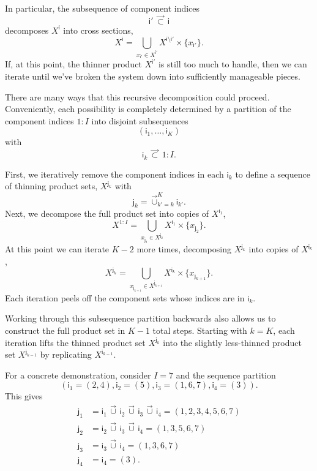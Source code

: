 \documentclass[
  letterpaper,
  DIV=11,
  numbers=noendperiod]{scrartcl}
\begin{document}
In particular, the subsequence of component indices \[
\mathsf{i}' \, \vec{\subset} \, \mathsf{i}
\] decomposes \(X^{ \mathsf{i} }\) into cross sections, \[
X^{ \mathsf{i} }
=
\bigcup_{ x_{ \mathsf{i}' } \in X^{ \mathsf{i}' }  }
X^{ \mathsf{i} \setminus \mathsf{i}' } \times
\{ x_{ \mathsf{i}' } \}.
\] If, at this point, the thinner product \(X^{ \mathsf{i}' }\) is still
too much to handle, then we can iterate until we've broken the system
down into sufficiently manageable pieces.

There are many ways that this recursive decomposition could proceed.
Conveniently, each possibility is completely determined by a partition
of the component indices \(1:I\) into disjoint subsequences \[
( \mathsf{i}_{1}, \ldots, \mathsf{i}_{K} )
\] with \[
\mathsf{i}_{k} \, \vec{\subset} \, 1:I.
\]

First, we iteratively remove the component indices in each
\(\mathsf{i}_{k}\) to define a sequence of thinning product sets,
\(X^{ \mathsf{j}_{k} }\) with \[
\mathsf{j}_{k}
=
\vec{\cup}_{k' = k}^{K} \mathsf{i}_{k'}.
\] Next, we decompose the full product set into copies of
\(X^{ \mathsf{i}_{1} }\), \[
X^{1:I}
=
\bigcup_{ x_{ \mathsf{j}_{2} } \in X^{ \mathsf{j}_{2} } }
X^{ \mathsf{i}_{1} } \times \{ x_{ \mathsf{j}_{2} }  \}.
\] At this point we can iterate \(K - 2\) more times, decomposing
\(X^{ \mathsf{j}_{k} }\) into copies of \(X^{ \mathsf{i}_{k} }\), \[
X^{ \mathsf{j}_{k} }
=
\bigcup_{ x_{ \mathsf{j}_{k + 1} } \in X^{ \mathsf{j}_{k + 1} } }
X^{ \mathsf{i}_{k} } \times \{ x_{ \mathsf{j}_{k + 1} }  \}.
\] Each iteration peels off the component sets whose indices are in
\(\mathsf{i}_{k}\).

Working through this subsequence partition backwards also allows us to
construct the full product set in \(K - 1\) total steps. Starting with
\(k = K\), each iteration lifts the thinned product set
\(X^{ \mathsf{j}_{k} }\) into the slightly less-thinned product set
\(X^{ \mathsf{j}_{k - 1} }\) by replicating
\(X^{ \mathsf{i}_{k - 1} }\).

For a concrete demonstration, consider \(I = 7\) and the sequence
partition \[
( \mathsf{i}_{1} = (2, 4),
  \mathsf{i}_{2} = (5),
  \mathsf{i}_{3} = (1, 6, 7),
  \mathsf{i}_{4} = (3)        ).
\] This gives \begin{align*}
\mathsf{j}_{1}
&=
\mathsf{i}_{1} \, \vec{\cup} \, \mathsf{i}_{2} \, \vec{\cup} \,
\mathsf{i}_{3} \, \vec{\cup} \, \mathsf{i}_{4}
=
(1, 2, 3, 4, 5, 6, 7)
\\
\mathsf{j}_{2}
&=
\mathsf{i}_{2} \, \vec{\cup} \,
\mathsf{i}_{3} \, \vec{\cup} \, \mathsf{i}_{4}
=
( 1, 3, 5, 6, 7 )
\\
\mathsf{j}_{3}
&=
\mathsf{i}_{3} \, \vec{\cup} \, \mathsf{i}_{4}
=
( 1, 3, 6, 7 )
\\
\mathsf{j}_{4}
&=
\mathsf{i}_{4}
=
( 3 ).
\end{align*}
\end{document}
